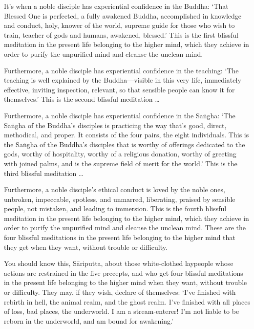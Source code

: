 \documentclass[12pt,openany]{book}%
\begin{document}
It’s when a noble disciple has experiential confidence in the Buddha: ‘That Blessed One is perfected, a fully awakened Buddha, accomplished in knowledge and conduct, holy, knower of the world, supreme guide for those who wish to train, teacher of gods and humans, awakened, blessed.’ This is the first blissful meditation in the present life belonging to the higher mind, which they achieve in order to purify the unpurified mind and cleanse the unclean mind. 

Furthermore, a noble disciple has experiential confidence in the teaching: ‘The teaching is well explained by the Buddha—visible in this very life, immediately effective, inviting inspection, relevant, so that sensible people can know it for themselves.’ This is the second blissful meditation … 

Furthermore, a noble disciple has experiential confidence in the \textsanskrit{Saṅgha}: ‘The \textsanskrit{Saṅgha} of the Buddha’s disciples is practicing the way that’s good, direct, methodical, and proper. It consists of the four pairs, the eight individuals. This is the \textsanskrit{Saṅgha} of the Buddha’s disciples that is worthy of offerings dedicated to the gods, worthy of hospitality, worthy of a religious donation, worthy of greeting with joined palms, and is the supreme field of merit for the world.’ This is the third blissful meditation … 

Furthermore, a noble disciple’s ethical conduct is loved by the noble ones, unbroken, impeccable, spotless, and unmarred, liberating, praised by sensible people, not mistaken, and leading to immersion. This is the fourth blissful meditation in the present life belonging to the higher mind, which they achieve in order to purify the unpurified mind and cleanse the unclean mind. These are the four blissful meditations in the present life belonging to the higher mind that they get when they want, without trouble or difficulty. 

You should know this, \textsanskrit{Sāriputta}, about those white-clothed laypeople whose actions are restrained in the five precepts, and who get four blissful meditations in the present life belonging to the higher mind when they want, without trouble or difficulty. They may, if they wish, declare of themselves: ‘I’ve finished with rebirth in hell, the animal realm, and the ghost realm. I’ve finished with all places of loss, bad places, the underworld. I am a stream-enterer! I’m not liable to be reborn in the underworld, and am bound for awakening.’ 
\end{document}
